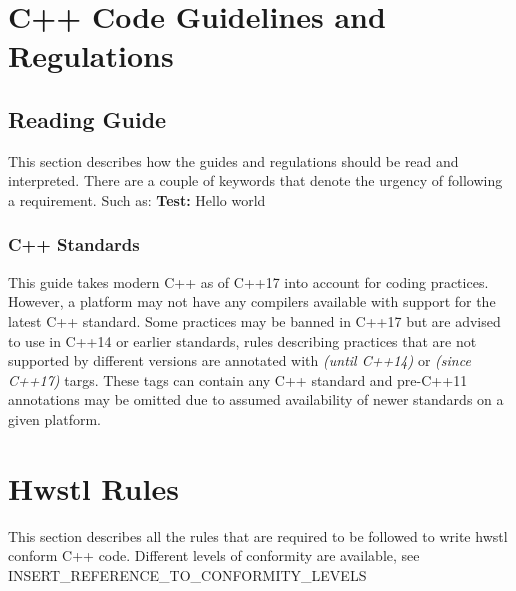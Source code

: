 \documentclass[12pt]{article}
\newcommand{\cppuntil}[1]{\footnotesize\textit{(until C++#1)}\normalsize}
\newcommand{\cppsince}[1]{\footnotesize\textit{(since C++#1)}\normalsize}
\begin{document}
\pagebreak
\section{C++ Code Guidelines and Regulations}
\subsection{Reading Guide}
This section describes how the guides and regulations should be read and
interpreted. There are a couple of keywords that denote the urgency of
following a requirement. Such as:
\bigbreak
\textbf{Test:} Hello world
\subsubsection{C++ Standards}
This guide takes modern C++ as of C++17 into account for coding practices.
However, a platform may not have any compilers available with support for the
latest C++ standard. Some practices may be banned in C++17 but are advised to
use in C++14 or earlier standards, rules describing practices that are not
supported by different versions are annotated with \cppuntil{14} or
\cppsince{17} targs. These tags can contain any C++ standard and pre-C++11
annotations may be omitted due to assumed availability of newer standards on a
given platform.

\pagebreak
\section{Hwstl Rules}
This section describes all the rules that are required to be followed to write
hwstl conform C++ code. Different levels of conformity are available, see
INSERT\_REFERENCE\_TO\_CONFORMITY\_LEVELS
\end{document}
